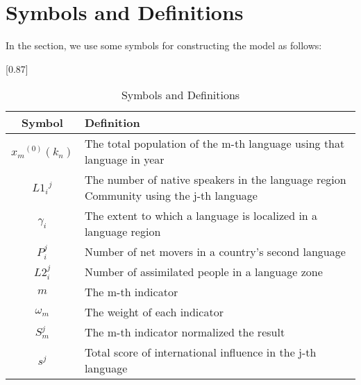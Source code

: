 \section{Symbols and Definitions }
\noindent
In the section, we use some symbols for constructing the model as follows: 
\begin{table}[H]
	\begin{center}
		\caption{\label{tab:Symbols_total}Symbols and Definitions}
			\renewcommand\arraystretch{1.5}
				 \scalebox{0.87}[0.87]{%
		\begin{tabular*}{35em}{ c p{12cm}}
			\toprule
		 Symbol  & Deﬁnition \\
		 \midrule
    	${x_m}^{(0)}({k_n})$&  The total population of the m-th language using that language in year \\
			$L{1_i}^j$	 & The number of native speakers in the language region Community  using the j-th language\\
			${\gamma _i}$	 & The extent to which a language is localized in a language region\\
			$P_i^j$	 & Number of net movers in a country's second language \\
			$L2_i^j$	 & Number of assimilated people in a language zone\\
			$m$	 &The m-th indicator \\
			${\omega _m}$	 & The weight of each indicator\\
			$S_m^j$	 & The m-th indicator normalized the result\\
			${s^j}$	 & Total score of international influence in the j-th language\\
			\bottomrule
		\end{tabular*}
	}
		\renewcommand\arraystretch{1}
	\end{center}
\end{table}

